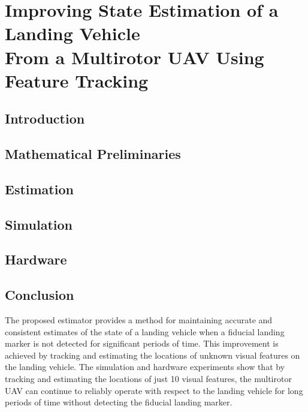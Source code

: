 
\chapter[Improving State Estimation of a Landing Vehicle
From a Multirotor UAV Using Feature Tracking]{Improving State Estimation of a Landing Vehicle \\
From a Multirotor UAV Using Feature Tracking}
\label{chp:estimation_paper}

\graphicspath{{estimation_paper/}}

\section{Introduction} \label{sec:intro}



\section{Mathematical Preliminaries} \label{sec:model}




\section{Estimation} \label{sec:estimation}





\section{Simulation} \label{sec:est_paper_simulation}


\section{Hardware} \label{sec:est_paper_hardware}







\section{Conclusion} \label{sec:conclusion}
The proposed estimator provides a method for maintaining accurate and consistent
estimates of the state of a landing vehicle when a fiducial landing marker is
not detected for significant periods of time. This improvement is achieved by
tracking and estimating the locations of unknown visual features on the landing
vehicle. The simulation and hardware experiments show that by tracking and
estimating the locations of just 10 visual features, the multirotor UAV can
continue to reliably operate with respect to the landing vehicle for long
periods of time without detecting the fiducial landing marker.
